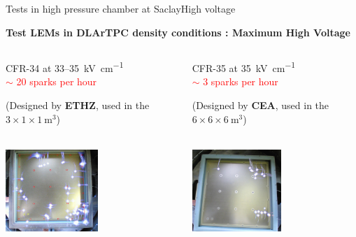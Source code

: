 \documentclass[10pt]{beamer}
\begin{document}
    \begin{frame}{Tests in high pressure chamber at Saclay}{High voltage}
    	\begin{center}
	    	\begin{scriptsize}
	    		\textbf{Test LEMs in DLArTPC density conditions : Maximum High Voltage}
	    	\end{scriptsize} 
	    \end{center}
	    \vspace{-0.5cm}
   		\begin{columns}
    		\begin{column}{0.5\textwidth}
    			\begin{center}
	    			\begin{scriptsize}
		    			CFR-34 at 33--\SI{35}{\kilo\volt\per\centi\meter}\\
		    			\textcolor{red}{$\sim$ 20 sparks per hour}\\
		    		\end{scriptsize}
	    			\begin{tiny}
		    			(Designed by \textbf{ETHZ}, used in the $3 \times 1 \times \SI{1}{\meter\cubed}$)
		    		\end{tiny}\\
	    			\includegraphics[height=3.1cm]{figures/666/sparks_34.png}
    			\end{center}
    		\end{column}\hfill
    		\begin{column}{0.5\textwidth}
    			\begin{center}
	    			\begin{scriptsize}
		    			CFR-35 at \SI{35}{\kilo\volt\per\centi\meter} \\
		    			\textcolor{red}{$\sim$ 3 sparks per hour}\\
		    		\end{scriptsize}
	    			\begin{tiny}
	    				(Designed by \textbf{CEA}, used in the $6 \times 6 \times \SI{6}{\meter\cubed}$)
	   				\end{tiny}\\
	    			\includegraphics[height=3.1cm]{figures/666/sparks_35.png}

\end{center}
\end{column}
\end{columns}
\end{frame}
\end{document}
